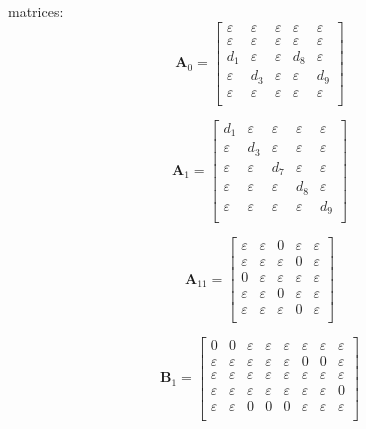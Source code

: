 \documentclass[11pt, a4paper, fleqn]{article}
\begin{document}
matrices:
\begin{equation*}
\mathbf{A}_{0} = 
\left[\begin{array}{ ccccc }
\varepsilon	&\varepsilon	&\varepsilon	&\varepsilon	&\varepsilon\\
\varepsilon	&\varepsilon	&\varepsilon	&\varepsilon	&\varepsilon\\
d_1	&\varepsilon	&\varepsilon	&d_8	&\varepsilon\\
\varepsilon	&d_3	&\varepsilon	&\varepsilon	&d_9\\
\varepsilon	&\varepsilon	&\varepsilon	&\varepsilon	&\varepsilon\\
\end{array}\right]
\end{equation*}

\begin{equation*}
\mathbf{A}_{1} = 
\left[\begin{array}{ ccccc }
d_1	&\varepsilon	&\varepsilon	&\varepsilon	&\varepsilon\\
\varepsilon	&d_3	&\varepsilon	&\varepsilon	&\varepsilon\\
\varepsilon	&\varepsilon	&d_7	&\varepsilon	&\varepsilon\\
\varepsilon	&\varepsilon	&\varepsilon	&d_8	&\varepsilon\\
\varepsilon	&\varepsilon	&\varepsilon	&\varepsilon	&d_9\\
\end{array}\right]
\end{equation*}

\begin{equation*}
\mathbf{A}_{11} = 
\left[\begin{array}{ ccccc }
\varepsilon	&\varepsilon	&0	&\varepsilon	&\varepsilon\\
\varepsilon	&\varepsilon	&\varepsilon	&0	&\varepsilon\\
0	&\varepsilon	&\varepsilon	&\varepsilon	&\varepsilon\\
\varepsilon	&\varepsilon	&0	&\varepsilon	&\varepsilon\\
\varepsilon	&\varepsilon	&\varepsilon	&0	&\varepsilon\\
\end{array}\right]
\end{equation*}

\begin{equation*}
\mathbf{B}_{1} = 
\left[\begin{array}{ cccccccc }
0	&0	&\varepsilon	&\varepsilon	&\varepsilon	&\varepsilon	&\varepsilon	&\varepsilon\\
\varepsilon	&\varepsilon	&\varepsilon	&\varepsilon	&\varepsilon	&0	&0	&\varepsilon\\
\varepsilon	&\varepsilon	&\varepsilon	&\varepsilon	&\varepsilon	&\varepsilon	&\varepsilon	&\varepsilon\\
\varepsilon	&\varepsilon	&\varepsilon	&\varepsilon	&\varepsilon	&\varepsilon	&\varepsilon	&0\\
\varepsilon	&\varepsilon	&0	&0	&0	&\varepsilon	&\varepsilon	&\varepsilon\\
\end{array}\right]
\end{equation*}
\end{document}
